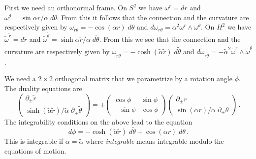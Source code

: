 \documentclass[a4paper,12pt]{article}
\newcommand{\alphatil}{\tilde{\alpha}}
\newcommand{\omegatil}{\tilde{\omega}}
\newcommand{\rtil}{\tilde{r}}
\newcommand{\thetatil}{\tilde{\theta}}
\begin{document}
First we need an orthonormal frame. On $S^{2}$ we have $\omega^{r} = dr$ and 
$\omega^{\theta}=\sin\alpha r/\alpha\;d\theta$. From this it 
follows that the connection and the curvature are respectively given by 
$\omega_{r\theta}= -\cos(\alpha r) \; d\theta$ and
$d\omega_{r\theta} = \alpha^{2}\omega^{r}\wedge\omega^{\theta}$.
On $H^{2}$ we have $\omegatil^{\rtil} = d\rtil$ and 
$\omegatil^{\thetatil}=\sinh\alpha \rtil/\alpha\;d\thetatil$.  From 
this we see that the connection and the curvature are respectively given by 
$\omegatil_{\rtil\thetatil}= -\cosh(\alphatil \rtil) \; d\thetatil$ and 
$d\omegatil_{\rtil\thetatil} = 
-\alphatil^{2}\omegatil^{\rtil}\wedge\omegatil^{\thetatil}$.

We need a $2\times 2$ orthogonal matrix that we parametrize by a 
rotation angle $\phi$. The duality equations are
\begin{equation}
    \left(
    \begin{array}{c}
        \partial_{\pm}\rtil  \\
        \sinh (\alphatil\rtil)/\alphatil\; \partial_{\pm}\thetatil
    \end{array}
    \right) = \pm
    \left(
    \begin{array}{rr}
        \cos\phi & \sin\phi  \\
        -\sin\phi & \cos\phi
    \end{array}
    \right)
    \left(
    \begin{array}{c}
        \partial_{\pm} r  \\
        \sin (\alpha r)/\alpha \; \partial_{\pm}\theta
    \end{array}
    \right)\,.
    \label{eq:dualrot}
\end{equation}
The integrability conditions on the above lead to the equation
\begin{equation}
	d\phi = -\cosh(\alphatil\rtil)\; d\thetatil
		+ \cos(\alpha r)\; d\theta\,.
	\label{eq:dphi}
\end{equation}
This is integrable if $\alpha=\alphatil$ where \emph{integrable} means 
integrable modulo the equations of motion.
\end{document}
